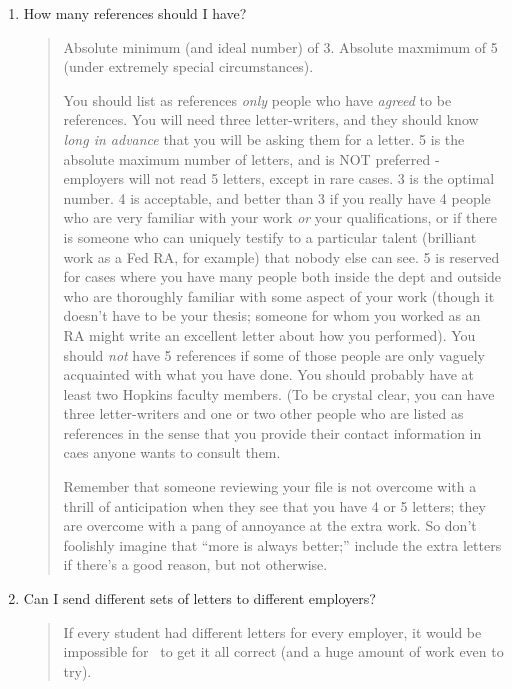 \documentclass{\classes/econtex}
\begin{document}
\begin{enumerate}
\item How many references should I have?

  \begin{quote}
    Absolute minimum (and ideal number) of 3.  Absolute maxmimum of 5 (under
    extremely special circumstances).  

    You should list as references \textit{only} people who have \textit{agreed}
    to be references.  You will need three letter-writers, and they should know \textit{long in advance} that you will be asking them for a letter.  5 is the absolute
    maximum number of letters, and is NOT preferred - employers will not read 5 letters,
    except in rare cases.  3 is the optimal number.  4 is acceptable, and
    better than 3 if you really have 4 people who are very familiar with
    your work \textit{or} your qualifications, or if there is someone who can
    uniquely testify to a particular talent (brilliant work as a Fed RA,
    for example) that nobody else can see.  5 is reserved for cases where
    you have many people both inside the dept and outside who are
    thoroughly familiar with some aspect of your work (though it doesn't
    have to be your thesis; someone for whom you worked as an RA might
    write an excellent letter about how you performed).  You should \textit{not} have 5 references if some of those people are only vaguely
    acquainted with what you have done.  You should probably have at least
    two Hopkins faculty members.  (To be crystal clear, you can have three letter-writers and one or two other people who are listed as references in the sense that you provide their contact information in caes anyone wants to consult them.

    Remember that someone reviewing your file is not overcome with
    a thrill of anticipation when they see that you have 4 or 5 letters; they
    are overcome with a pang of annoyance at the extra work.  So don't foolishly
    imagine that ``more is always better;'' include the extra letters if
    there's a good reason, but not otherwise.


  \end{quote}
\item  Can I send different sets of letters to different employers?

  \begin{quote}
    If every student had different letters for every employer, it would be impossible for {\JMStaffName}~to get it all correct (and a huge amount of work even to try).


\end{quote}
\end{enumerate}
\end{document}
